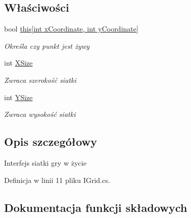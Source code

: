 \subsection*{Właściwości}
\begin{DoxyCompactItemize}
\item 
bool \hyperlink{interface_convay_1_1_core_1_1_interfaces_1_1_i_grid_ae1562a81e75321521382918483706e65}{this\mbox{[}int x\+Coordinate, int y\+Coordinate\mbox{]}}
\begin{DoxyCompactList}\small\item\em Określa czy punkt jest żywy \end{DoxyCompactList}\item 
int \hyperlink{interface_convay_1_1_core_1_1_interfaces_1_1_i_grid_a1e8b553ad4216cc871e5ba22518cafdb}{X\+Size}
\begin{DoxyCompactList}\small\item\em Zwraca szerokość siatki \end{DoxyCompactList}\item 
int \hyperlink{interface_convay_1_1_core_1_1_interfaces_1_1_i_grid_a049f4b262c16e04b2bd4e83c2c30deac}{Y\+Size}
\begin{DoxyCompactList}\small\item\em Zwraca wysokość siatki \end{DoxyCompactList}\end{DoxyCompactItemize}


\subsection{Opis szczegółowy}
Interfejs siatki gry w życie 



Definicja w linii 11 pliku I\+Grid.\+cs.



\subsection{Dokumentacja funkcji składowych}
\hypertarget{interface_convay_1_1_core_1_1_interfaces_1_1_i_grid_afb85615bea4fe14885fc2c36b16a9309}{}\label{interface_convay_1_1_core_1_1_interfaces_1_1_i_grid_afb85615bea4fe14885fc2c36b16a9309} 
